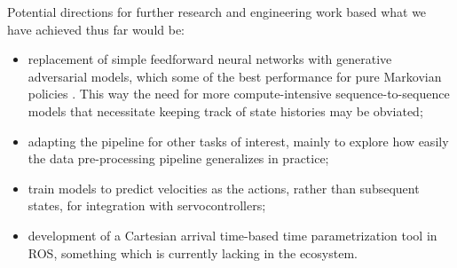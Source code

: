 \documentclass{article}
\begin{document}
Potential directions for further research and engineering work based what we have achieved thus far would be:
\begin{itemize}
	\item replacement of simple feedforward neural networks with generative adversarial models, which some of the best performance for pure Markovian policies \citep{ho2016generative}. This way the need for more compute-intensive sequence-to-sequence models that necessitate keeping track of state histories may be obviated;
	\item adapting the pipeline for other tasks of interest, mainly to explore how easily the data pre-processing pipeline generalizes in practice;
	\item train models to predict velocities as the actions, rather than subsequent states, for integration with servocontrollers;
	\item development of a Cartesian arrival time-based time parametrization tool in ROS, something which is currently lacking in the ecosystem.
\end{itemize}



\end{document}
